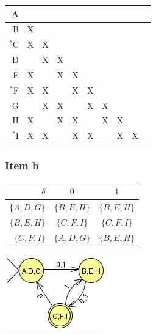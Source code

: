 \documentclass[docid=TP07]{tcom_TP}
\begin{document}
{\begin{center}
\begin{tabular}{r || c | c | c | c | c | c | c | c | c}
	A  & \cellcolor{gray} & \cellcolor{gray} & \cellcolor{gray} & \cellcolor{gray} & \cellcolor{gray} & \cellcolor{gray} & \cellcolor{gray} & \cellcolor{gray} & \cellcolor{gray} \\ \hline
	B  & X  & \cellcolor{gray} & \cellcolor{gray} & \cellcolor{gray} & \cellcolor{gray} & \cellcolor{gray} & \cellcolor{gray} & \cellcolor{gray} & \cellcolor{gray} \\ \hline
	$^*$C & X  & X  & \cellcolor{gray} & \cellcolor{gray} & \cellcolor{gray} & \cellcolor{gray} & \cellcolor{gray} & \cellcolor{gray} & \cellcolor{gray} \\ \hline
	D  &    & X  & X  & \cellcolor{gray} & \cellcolor{gray} & \cellcolor{gray} & \cellcolor{gray} & \cellcolor{gray} & \cellcolor{gray} \\ \hline
	E  & X  &    & X  & X  & \cellcolor{gray} & \cellcolor{gray} & \cellcolor{gray} & \cellcolor{gray} & \cellcolor{gray} \\ \hline
	$^*$F & X  & X  &    & X  & X  & \cellcolor{gray} & \cellcolor{gray} & \cellcolor{gray} & \cellcolor{gray} \\ \hline
	G  &    & X  & X  &    & X  & X  & \cellcolor{gray} & \cellcolor{gray} & \cellcolor{gray} \\ \hline
	H  & X  &    & X  & X  &    & X  & X  & \cellcolor{gray} & \cellcolor{gray} \\ \hline
	$^*$I & X  & X  &    & X  & X  &    & X  & X  & \cellcolor{gray} 
\end{tabular} \end{center}
\subsubsection{Item b}
\begin{center}
\begin{minipage}[c]{0.45\textwidth}
\begin{center} \begin{tabular}{r | c c}
	$\delta   $ & $0        $ & $1        $ \\ \hline
	$\{A,D,G\}$ & $\{B,E,H\}$ & $\{B,E,H\}$ \\
	$\{B,E,H\}$ & $\{C,F,I\}$ & $\{C,F,I\}$ \\
	$\{C,F,I\}$ & $\{A,D,G\}$ & $\{B,E,H\}$
\end{tabular} \end{center}
\end{minipage}%
\begin{minipage}[c]{0.25\textwidth}
\begin{center} \includegraphics[scale=0.5]{TP07_5b} \end{center}
\end{minipage}
\end{center}
}
\end{document}
